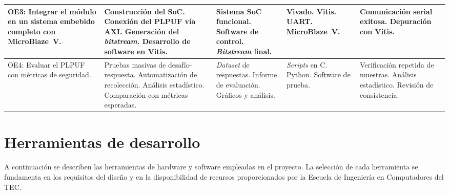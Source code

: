 \begin{table}[htbp]
\begin{tabular}{|p{3.0cm}|p{3.0cm}|p{2.5cm}|p{2.5cm}|p{2.5cm}|}
OE3: Integrar el módulo en un sistema embebido completo con MicroBlaze~V. &
Construcción del SoC.\newline
Conexión del PLPUF vía AXI.\newline
Generación del \textit{bitstream}.\newline
Desarrollo de software en Vitis. &
Sistema SoC funcional.\newline
Software de control.\newline
\textit{Bitstream} final. &
Vivado.\newline
Vitis.\newline
UART.\newline
MicroBlaze~V. &
Comunicación serial exitosa.\newline
Depuración con Vitis. \\
\hline

OE4: Evaluar el PLPUF con métricas de seguridad. &
Pruebas masivas de desafío-respuesta.\newline
Automatización de recolección.\newline
Análisis estadístico.\newline
Comparación con métricas esperadas. &
\textit{Dataset} de respuestas.\newline
Informe de evaluación.\newline
Gráficos y análisis. &
\textit{Scripts} en C.\newline
Python.\newline
Software de prueba. &
Verificación repetida de muestras.\newline
Análisis estadístico.\newline
Revisión de consistencia. \\
\hline
\end{tabular}
\end{table}

\section{Herramientas de desarrollo}
\label{sec:herramientas}

A continuación se describen las herramientas de hardware y software empleadas
en el proyecto. La selección de cada herramienta se fundamenta en los
requisitos del diseño y en la disponibilidad de recursos proporcionados por
la Escuela de Ingeniería en Computadores del TEC.

